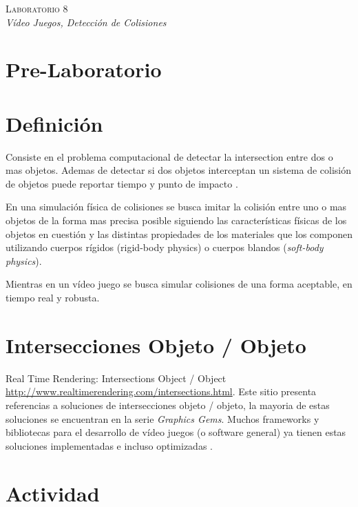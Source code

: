 \begin{center}
\textsc{\Large Laboratorio 8}~\\
\emph{\large Vídeo Juegos, Detección de Colisiones}
\end{center}

\section{Pre-Laboratorio}

\section{Definición}
Consiste en el problema computacional de detectar la intersection entre dos o mas objetos. Ademas de detectar si dos objetos interceptan un sistema de colisión de objetos puede reportar tiempo y punto de impacto \cite{ericson_collision}.

En una simulación física de colisiones se busca imitar la colisión entre uno o mas objetos de la forma mas precisa posible siguiendo las características físicas de los objetos en cuestión y las distintas propiedades de los materiales que los componen utilizando cuerpos rígidos (rigid-body physics) o cuerpos blandos (\emph{soft-body physics}).

Mientras en un vídeo juego se busca simular colisiones de una forma aceptable, en tiempo real y robusta.

\section{Intersecciones Objeto / Objeto}

Real Time Rendering: Intersections Object / Object \url{http://www.realtimerendering.com/intersections.html}. Este sitio presenta referencias a soluciones de intersecciones objeto / objeto, la mayoria de estas soluciones se encuentran en la serie \emph{Graphics Gems}. Muchos frameworks y bibliotecas para el desarrollo de vídeo juegos (o software general) ya tienen estas soluciones implementadas e incluso optimizadas \cite{rtr_intersections}.

\section{Actividad}
